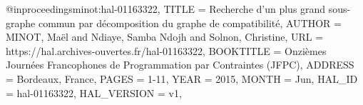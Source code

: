 @inproceedings{minot:hal-01163322,
  TITLE = {{Recherche d'un plus grand sous-graphe commun par d{\'e}composition du graphe de compatibilit{\'e}}},
  AUTHOR = {MINOT, Ma{\"e}l and Ndiaye, Samba Ndojh and Solnon, Christine},
  URL = {https://hal.archives-ouvertes.fr/hal-01163322},
  BOOKTITLE = {{Onzi{\`e}mes Journ{\'e}es Francophones de Programmation par Contraintes (JFPC)}},
  ADDRESS = {Bordeaux, France},
  PAGES = {1-11},
  YEAR = {2015},
  MONTH = Jun,
  HAL_ID = {hal-01163322},
  HAL_VERSION = {v1},
}